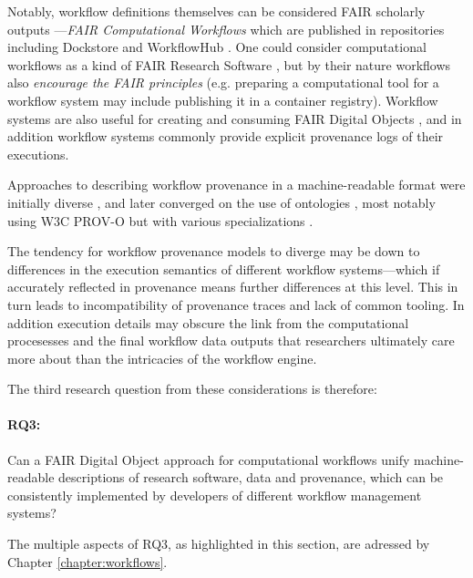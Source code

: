 Notably, workflow definitions themselves can be considered FAIR scholarly outputs \cite{Goble 2020}---\emph{FAIR Computational Workflows} which are published in repositories including Dockstore \cite{Yuen 2021} and WorkflowHub \cite{Goble 2021}.
One could consider computational workflows as a kind of FAIR Research Software \cite{de Visser 2023}, but by their nature workflows also \emph{encourage the FAIR principles} (e.g. preparing a computational tool for a workflow system \cite{Brack 2022a} may include publishing it in a container registry). Workflow systems are also useful for creating and consuming FAIR Digital Objects \cite{Wittenburg 2022b}, and in addition workflow systems commonly provide explicit provenance logs of their executions.

Approaches to describing workflow provenance in a machine-readable format were initially diverse \cite{Cruz 2009}, and later converged on the use of ontologies \cite{Missier 2010}, most notably using W3C PROV-O \cite{Lebo 2013a} but with various specializations \cite{Garijo 2011,Garijo 2012,Missier 2013,Belhajjame 2015,Cuevas-Vicenttín 2016}. 

The tendency for workflow provenance models to diverge may be down to differences in the execution semantics of different workflow systems---which if accurately reflected in provenance means further differences at this level. This in turn leads to incompatibility of provenance traces and lack of common tooling. In addition execution details may obscure the link from the computational procesesses and the final workflow data outputs that researchers ultimately care more about than the intricacies of the workflow engine.

The third research question from these considerations is therefore: 

\paragraph{RQ3:} \label{rq3} Can a FAIR Digital Object approach for computational workflows unify machine-readable descriptions of research software, data and provenance, which can be consistently implemented by developers of different workflow management systems?

The multiple aspects of RQ3, as highlighted in this section, are adressed by Chapter \ref{chapter:workflows}.

